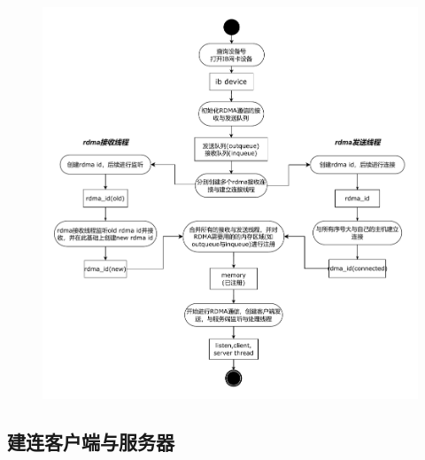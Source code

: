 {    \begin{figure}[H]
        \centering
        \includegraphics[width=\textwidth]{Img/rdma_init.drawio.pdf}
        \label{fig:mjiajia-cm-connection}
    \end{figure}

    \subsection{建连客户端与服务器}




}
